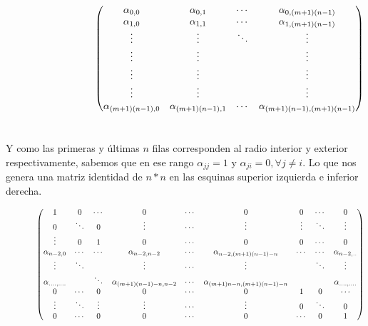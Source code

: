 $
\hspace{3.2cm}
     \begin{pmatrix}
      \alpha_{0,0} & \alpha_{0,1} & \cdots & \alpha_{0,(m+1)(n-1)} \\
      \alpha_{1,0} & \alpha_{1,1} & \cdots & \alpha_{1,(m+1)(n-1)} \\
      \vdots  & \vdots  & \ddots & \vdots \\
      \vdots  & \vdots  &        & \vdots \\
      \vdots  & \vdots  &        & \vdots \\
      \vdots  & \vdots  &        & \vdots \\
      \alpha_{(m+1)(n-1),0} & \alpha_{(m+1)(n-1),1} & \cdots & \alpha_{(m+1)(n-1),(m+1)(n-1)} 
     \end{pmatrix}
$
\\
\\
\\
Y como las primeras y \'ultimas $n$ filas corresponden al radio interior y exterior respectivamente, sabemos que en ese rango $\alpha_{jj} = 1$ y $\alpha_{ji} = 0, \forall j \neq i$. Lo que nos genera una matriz identidad de $n*n$ en las esquinas superior izquierda e inferior derecha.

$
\hspace{1.3cm}
     \begin{pmatrix}
      1 & 0 & \cdots & 0 & \cdots & 0 & 0 & \cdots & 0 \\
      0 & \ddots & 0 & \vdots & \cdots & \vdots & \vdots & \ddots & \vdots \\   
      \vdots  & 0  & 1 & 0 & \cdots & 0 & 0 & \cdots & 0 \\
      \alpha_{n-2,0} & \cdots & \cdots & \alpha_{n-2,n-2} & \cdots & \alpha_{n-2,(m+1)(n-1)-n} & \cdots & \cdots & \alpha_{n-2,..} \\
      \vdots  & \ddots  &  & \vdots & \cdots & \vdots &  & \ddots & \vdots \\        
      \alpha_{....,....} &  &\ddots & \alpha_{(m+1)(n-1)-n, n-2} & \cdots & \alpha_{(m+1)n-n,(m+1)(n-1)-n} & & & \alpha_{....,....}  \\
      0 & \cdots & 0 & 0 & \cdots & 0 & 1 & 0 & \cdots  \\
      \vdots & \ddots & \vdots & \vdots & \cdots & \vdots & 0 & \ddots & 0 \\
      0 & \cdots & 0 & 0 & \cdots  & 0 & \cdots & 0 & 1 
     \end{pmatrix}
$
